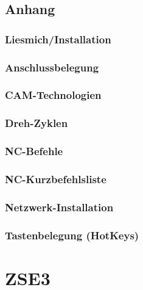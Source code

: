 \documentclass[a4paper]{book}
\begin{document}
\chapter{Anhang}
	\section{Liesmich/Installation} 
	\section{Anschlussbelegung} 
	\section{CAM-Technologien} 
	\section{Dreh-Zyklen} 
	\section{NC-Befehle} 
	\section{NC-Kurzbefehlsliste} 
	\section{Netzwerk-Installation} 
	\section{Tastenbelegung (HotKeys)} 
 
 
\part{ZSE3}
\end{document}
